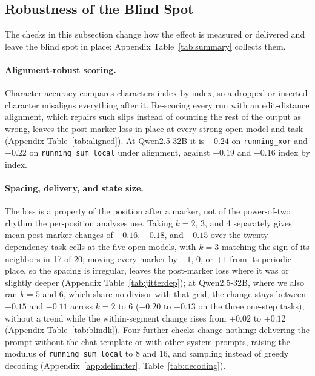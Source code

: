 \documentclass[10pt]{article} %
\newcommand{\task}[1]{\texttt{#1}}
\begin{document}
\subsection{Robustness of the Blind Spot}
\label{sec:robust}

The checks in this subsection change how the effect is measured or delivered and leave the blind spot in place; Appendix Table~\ref{tab:summary} collects them.

\paragraph{Alignment-robust scoring.} Character accuracy compares characters index by index, so a dropped or inserted character misaligns everything after it. Re-scoring every run with an edit-distance alignment, which repairs such slips instead of counting the rest of the output as wrong, leaves the post-marker loss in place at every strong open model and task (Appendix Table~\ref{tab:aligned}). At Qwen2.5-32B it is $-0.24$ on \task{running\_xor} and $-0.22$ on \task{running\_sum\_local} under alignment, against $-0.19$ and $-0.16$ index by index.

\paragraph{Spacing, delivery, and state size.} The loss is a property of the position after a marker, not of the power-of-two rhythm the per-position analyses use. Taking $k = 2$, 3, and 4 separately gives mean post-marker changes of $-0.16$, $-0.18$, and $-0.15$ over the twenty dependency-task cells at the five open models, with $k = 3$ matching the sign of its neighbors in 17 of 20; moving every marker by $-1$, 0, or $+1$ from its periodic place, so the spacing is irregular, leaves the post-marker loss where it was or slightly deeper (Appendix Table~\ref{tab:jitterdep}); at Qwen2.5-32B, where we also ran $k = 5$ and 6, which share no divisor with that grid, the change stays between $-0.15$ and $-0.11$ across $k = 2$ to 6 ($-0.20$ to $-0.13$ on the three one-step tasks), without a trend while the within-segment change rises from $+0.02$ to $+0.12$ (Appendix Table~\ref{tab:blindk}). Four further checks change nothing: delivering the prompt without the chat template or with other system prompts, raising the modulus of \task{running\_sum\_local} to 8 and 16, and sampling instead of greedy decoding (Appendix~\ref{app:delimiter}, Table~\ref{tab:decoding}).
\end{document}
